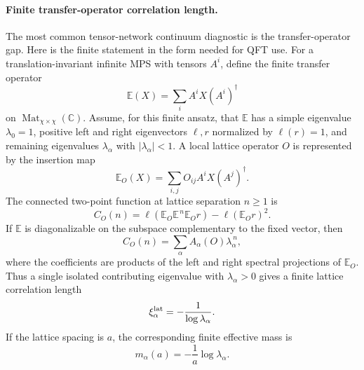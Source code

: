 \paragraph{Finite transfer-operator correlation length.}
The most common tensor-network continuum diagnostic is the transfer-operator
gap.  Here is the finite statement in the form needed for QFT use.  For a
translation-invariant infinite MPS with tensors \(A^i\), define the finite
transfer operator
\[
  \mathbb E(X)
  =
  \sum_i A^i X (A^i)^\dagger
\]
on \(\operatorname{Mat}_{\chi\times\chi}(\mathbb C)\).  Assume, for this
finite ansatz, that \(\mathbb E\) has a simple eigenvalue
\(\lambda_0=1\), positive left and right eigenvectors \(\ell,r\) normalized
by \(\ell(r)=1\), and remaining eigenvalues
\(\lambda_\alpha\) with \(|\lambda_\alpha|<1\).  A local lattice operator
\(O\) is represented by the insertion map
\[
  \mathbb E_O(X)
  =
  \sum_{i,j}O_{ij}A^iX(A^j)^\dagger .
\]
The connected two-point function at lattice separation \(n\ge1\) is
\begin{equation}
  C_O(n)
  =
  \ell\!\left(\mathbb E_O\mathbb E^{\,n}\mathbb E_O r\right)
  -
  \ell(\mathbb E_Or)^2 .
  \label{eq:mps-transfer-connected-correlator}
\end{equation}
If \(\mathbb E\) is diagonalizable on the subspace complementary to the
fixed vector, then
\begin{equation}
  C_O(n)
  =
  \sum_\alpha A_\alpha(O)\lambda_\alpha^{\,n},
  \label{eq:mps-transfer-spectral-expansion}
\end{equation}
where the coefficients are products of the left and right spectral
projections of \(\mathbb E_O\).  Thus a single isolated contributing
eigenvalue with \(\lambda_\alpha>0\) gives a finite lattice correlation
length
\[
  \xi_\alpha^{\rm lat}
  =
  -\frac1{\log\lambda_\alpha}.
\]
If the lattice spacing is \(a\), the corresponding finite effective mass is
\begin{equation}
  m_\alpha(a)
  =
  -\frac1a\log\lambda_\alpha .
  \label{eq:mps-transfer-effective-mass}
\end{equation}

